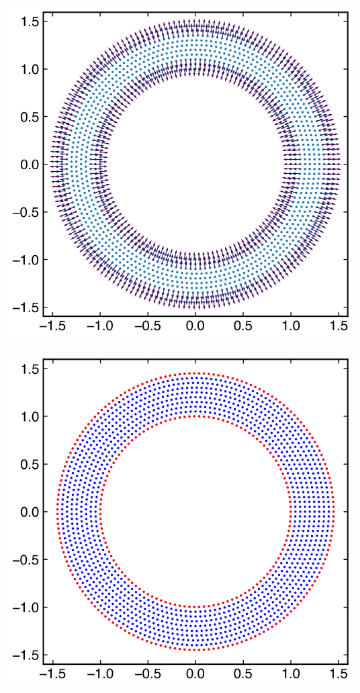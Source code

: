 \documentclass[preprint,12pt]{elsarticle}
\begin{document}
\begin{figure}[!htpb]
  \centering
  \begin{subfigure}{0.48\textwidth}
    \centering
    \includegraphics[width=1\linewidth]{fig_1_a}
    \subcaption{}%
    \label{fig:free_surface_circle_normals}
  \end{subfigure}
  \begin{subfigure}{0.48\textwidth}
    \centering
    \includegraphics[width=1\linewidth]{fig_1_b}

\end{subfigure}
\end{figure}
\end{document}
